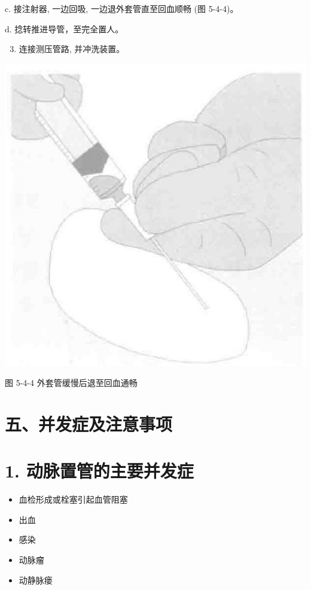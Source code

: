 \documentclass[10pt]{article}
\begin{document}
c. 接注射器, 一边回吸, 一边退外套管直至回血顺畅 (图 5-4-4)。

d. 捻转推进导管，至完全置人。

\begin{enumerate}
  \setcounter{enumi}{2}
  \item 连接测压管路, 并冲洗装置。
\end{enumerate}

\begin{center}
\includegraphics[max width=\textwidth]{2024_07_05_645bb794a4d4f32ee0c8g-299}
\end{center}

图 5-4-4 外套管缓慢后退至回血通畅

\section*{五、并发症及注意事项}
\section*{1. 动脉置管的主要并发症}
\begin{itemize}
  \item 血检形成或栓塞引起血管阻塞
  \item 出血
  \item 感染
  \item 动脉瘤
  \item 动静脉瘘
\end{itemize}
\end{document}
